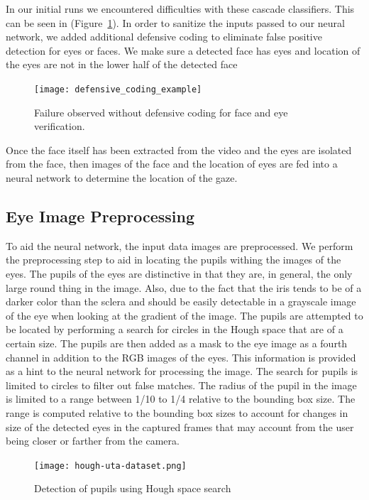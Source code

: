 \documentclass[10pt,twocolumn,letterpaper]{article}
\begin{document}
In our initial runs we encountered difficulties with these cascade classifiers.
This can be seen in  (Figure~\ref{fig:defensive}).
In order to sanitize the inputs passed to our neural network, we added 
additional defensive coding to eliminate false positive detection 
for eyes or faces. We make sure a detected face has eyes 
and location of the eyes are not in the lower half of the detected face

\begin{figure}
  \begin{center}
    \texttt{[image: defensive\_coding\_example]}
  \end{center}
  \caption{Failure observed without defensive coding for face and eye
    verification.}
  \label{fig:defensive}
\end{figure}


Once the face itself has been extracted from the video and the eyes
are isolated from the face, then images  of the face and the location
of eyes are fed into a neural network to determine the location of the
gaze.

\subsection{Eye Image Preprocessing}
To aid the neural network, the input data images are preprocessed. We
perform the preprocessing step to aid in locating the pupils withing
the images of the eyes. The pupils of the eyes are distinctive in that
they are, in general, the only large round thing in the image. Also,
due to the fact that the iris tends to be of a darker color than the
sclera and should be easily detectable in a grayscale image of the
eye when looking at the gradient of the image. The pupils are
attempted to be located by performing a search for circles in the
Hough space that are of a certain size. The pupils are then added as a
mask to the eye image as a fourth channel in addition to the RGB
images of the eyes. This information is provided as a hint to the
neural network for processing the image. The search for pupils is
limited to circles to filter out false matches. The radius of the pupil
in the image is limited to a range between 1/10 to 1/4 relative to the
bounding box size. The range is computed relative to the bounding box
sizes to account for changes in size of the detected eyes in the
captured frames that may account from the user being closer or farther
from the camera. 

\begin{figure}[!h]
  \begin{center}
    \texttt{[image: hough-uta-dataset.png]}
    \caption{Detection of pupils using Hough space search}
    \label{fig:hough-pupils-uta}
  \end{center}
\end{figure}
\end{document}
